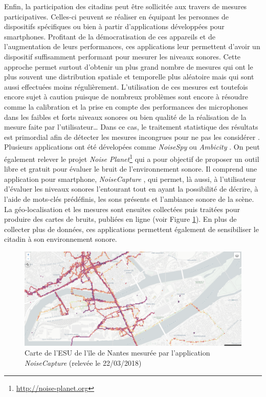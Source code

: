 Enfin, la participation des citadins peut être sollicitée aux travers de mesures participatives. Celles-ci peuvent se réaliser en équipant les personnes de dispositifs spécifiques \cite{aumond2017study} ou bien à partir d'applications développées pour smartphones. Profitant de la démocratisation de ces appareils et de l'augmentation de leurs performances, ces applications leur permettent d'avoir un dispositif suffisamment performant pour mesurer les niveaux sonores. Cette approche permet surtout d'obtenir un plus grand nombre de mesures qui ont le plus souvent une distribution spatiale et temporelle plus aléatoire mais qui sont aussi effectuées moins régulièrement. L'utilisation de ces mesures est toutefois encore sujet à caution puisque de nombreux problèmes sont encore à résoudre comme la calibration et la prise en compte des performances des microphones dans les faibles et forts niveaux sonores ou bien qualité de la réalisation de la mesure faite par l'utilisateur\dots{} Dans ce cas, le traitement statistique des résultats est primordial afin de détecter les mesures incongrues pour ne pas les considérer \cite{guillaume2016noise}. Plusieurs applications ont été dévelopées comme \textit{NoiseSpy} \cite{kanjo_noisespy_2010} ou \textit{Ambicity} \cite{ventura2017estimation}. On peut également relever le projet \textit{Noise Planet}\footnote{\url{http://noise-planet.org}} qui a pour objectif de proposer un outil libre et gratuit pour évaluer le bruit de l'environnement sonore. Il comprend une application pour smartphone, \textit{NoiseCapture} \cite{guillaume2016noise}, qui permet, là aussi, à l'utilisateur d'évaluer les niveaux sonores l'entourant tout en ayant la possibilité de décrire, à l'aide de mots-clés prédéfinis, les sons présents et l'ambiance sonore de la scène. La géo-localisation et les mesures sont ensuites collectées puis traitées pour produire des cartes de bruits, publiées en ligne (voir Figure \ref{fig:carte_noiseModelling}). En plus de collecter plus de données, ces applications permettent également de sensibiliser le citadin à son environnement sonore.\\

\begin{figure}[t]
\centering
\includegraphics[width=0.7\linewidth]{./figures/cartographie/noise_modelling.PNG}
\caption{Carte de l'ESU de l'île de Nantes mesurée par l'application \textit{NoiseCapture}  (relevée le 22/03/2018)}
\label{fig:carte_noiseModelling}
\end{figure}


